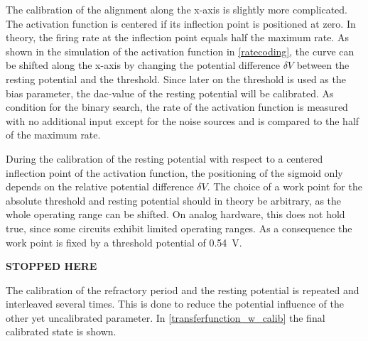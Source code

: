 The calibration of the alignment along the x-axis is slightly more complicated. The activation function is centered if its inflection point is positioned at zero. In theory, the firing rate at the inflection point equals half the maximum rate. As shown in the simulation of the activation function in \cref{ratecoding}, the curve can be shifted along the x-axis by changing the potential difference $\delta V$ between the resting potential and the threshold. Since later on the threshold is used as the bias parameter, the \gls{dac}-value of the resting potential will be calibrated. As condition for the binary search, the rate of the activation function is measured with no additional input except for the noise sources and is compared to the half of the maximum rate.

During the calibration of the resting potential with respect to a centered inflection point of the activation function, the positioning of the sigmoid only depends on the relative potential difference $\delta V$. The choice of a work point for the absolute threshold and resting potential should in theory be arbitrary, as the whole operating range can be shifted. On analog hardware, this does not hold true, since some circuits exhibit limited operating ranges. As a consequence the work point is fixed by a threshold potential of \SI{0.54}{\V}.


\textbf{STOPPED HERE}

The calibration of the refractory period and the resting potential is repeated and interleaved several times. This is done to reduce the potential influence of the other yet uncalibrated parameter. In \cref{transferfunction_w_calib} the final calibrated state is shown. 

